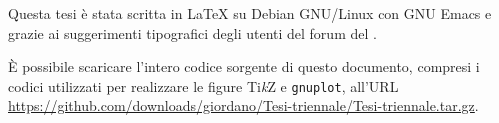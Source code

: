 \thispagestyle{empty}
\hfill
\vfill
Questa tesi è stata scritta in \LaTeX{} su Debian GNU/Linux con GNU Emacs e
grazie ai suggerimenti tipografici degli utenti del forum del \GuIT.

È possibile scaricare l'intero codice sorgente di questo documento, compresi i
codici utilizzati per realizzare le figure Ti\emph{k}Z e \texttt{gnuplot},
all'URL
\url{https://github.com/downloads/giordano/Tesi-triennale/Tesi-triennale.tar.gz}.

